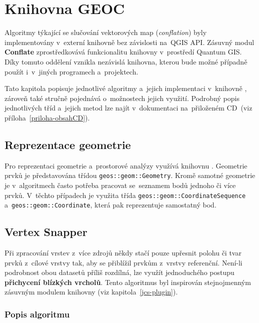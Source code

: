 \chapter{Knihovna GEOC}
\label{5-geoc}

Algoritmy týkající se slučování vektorových map (\textit{conflation}) byly
implementovány v~externí knihovně  bez závislosti na~QGIS API. 
Zásuvný modul \textbf{Conflate} zprostředkovává funkcionalitu knihovny 
v~prostředí Quantum GIS. Díky tomuto oddělení vznikla nezávislá knihovna, 
kterou bude možné případně použít i~v~jiných programech a~projektech.

Tato kapitola popisuje jednotlivé algoritmy a~jejich implementaci v~knihovně
, zároveň také stručně pojednává o~možnostech  jejich využití.
Podrobný popis jednotlivých tříd a~jejich metod lze najít
v~dokumentaci na~přiloženém CD~(viz příloha~\ref{priloha-obsahCD}). 


\section{Reprezentace geometrie}
\label{reprezentace-geom}

Pro reprezentaci geometrie a~prostorové analýzy  využívá
knihovnu . Geometrie prvků je představována třídou 
\texttt{geos::geom::Geometry}. Kromě samotné geometrie je v~algoritmech
často potřeba pracovat se~seznamem bodů jednoho či více prvků. V~těchto
případech je využita třída \texttt{geos::geom::CoordinateSequence}
a~\texttt{geos::geom::Coordinate}, která pak reprezentuje samostatný bod.


\section{Vertex Snapper} 
\label{vertexsnapper}

Při zpracování vrstev z~více zdrojů někdy stačí pouze upřesnit polohu či tvar 
prvků z~cílové vrstvy tak, aby se přiblížil prvkům z~vrstvy referenční. 
\mbox{Není-li} podrobnost obou datasetů příliš rozdílná, lze využít jednoduchého 
postupu \textbf{přichycení blízkých vrcholů}. Tento algoritmus byl inspirován
stejnojmenným zásuvným mo\-dulem knihovny  (viz kapitola~\ref{jcs-plugin}).


\subsection{Popis algoritmu}
\label{vs-algoritmus}

